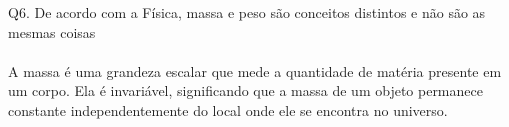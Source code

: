 \documentclass[a4paper,14pt]{article}
\begin{document}
	\noindent Q6. De acordo com a Física, massa e peso são conceitos distintos e não são as mesmas coisas \\\\
	A massa é uma grandeza escalar que mede a quantidade de matéria presente em um corpo. Ela é invariável, significando que a massa de um objeto permanece constante independentemente do local onde ele se encontra no universo. \\\\
\end{document}
